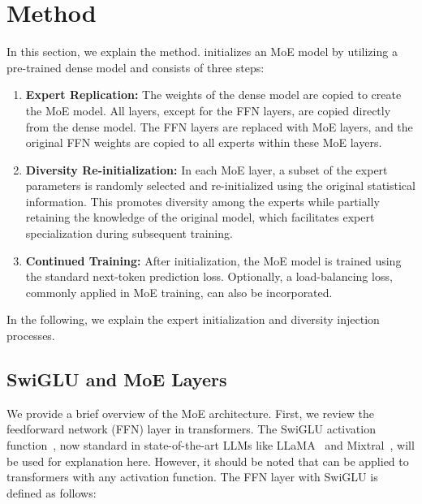 \section{Method}
\label{sec:method}
In this section, we explain the \methodname{} method. \methodname{} initializes an MoE model by utilizing a pre-trained dense model and consists of three steps:

\begin{enumerate}
\item \textbf{Expert Replication:} The weights of the dense model are copied to create the MoE model. All layers, except for the FFN layers, are copied directly from the dense model. The FFN layers are replaced with MoE layers, and the original FFN weights are copied to all experts within these MoE layers.

\item \textbf{Diversity Re-initialization:} In each MoE layer, a subset of the expert parameters is randomly selected and re-initialized using the original statistical information. This promotes diversity among the experts while partially retaining the knowledge of the original model, which facilitates expert specialization during subsequent training.

\item \textbf{Continued Training:} After initialization, the MoE model is trained using the standard next-token prediction loss. Optionally, a load-balancing loss, commonly applied in MoE training, can also be incorporated.
\end{enumerate}
In the following, we explain the expert initialization and diversity injection processes.


\subsection{SwiGLU and MoE Layers}
\label{sec:methods:preliminaries}

We provide a brief overview of the MoE architecture. First, we review the feedforward network (FFN) layer in transformers. The SwiGLU activation function~\citep{shazeer2020gluvariantsimprovetransformer}, now standard in state-of-the-art LLMs like LLaMA~\citep{touvron2023llamaopenefficientfoundation} and Mixtral~\citep{jiang2024mixtralexperts}, will be used for explanation here. However, it should be noted that \methodname{} can be applied to transformers with any activation function. The FFN layer with SwiGLU is defined as follows:

